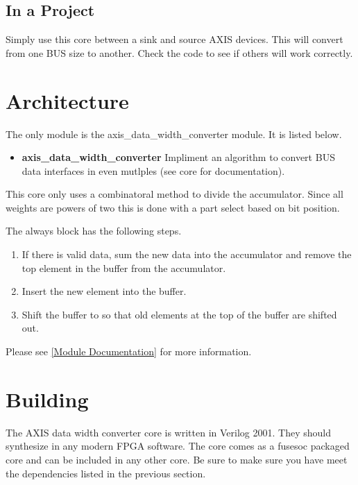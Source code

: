 

\subsection{In a Project}
\par
Simply use this core between a sink and source AXIS devices. This will convert from one BUS size to another. Check the code to see if others will work correctly.

\section{Architecture}
\par
The only module is the axis\_data\_width\_converter module. It is listed below.

\begin{itemize}
  \item \textbf{axis\_data\_width\_converter } Impliment an algorithm to convert BUS data interfaces in even mutlples (see core for documentation).
\end{itemize}

\par
This core only uses a combinatoral method to divide the accumulator. Since all weights are powers of two this is done with a part select based on bit position.

\par
The always block has the following steps.
\begin{enumerate}
\item If there is valid data, sum the new data into the accumulator and remove the top element in the buffer from the accumulator.
\item Insert the new element into the buffer.
\item Shift the buffer to so that old elements at the top of the buffer are shifted out.
\end{enumerate}

Please see \ref{Module Documentation} for more information.

\section{Building}

\par
The AXIS data width converter core is written in Verilog 2001. They should synthesize in any modern FPGA software. The core comes as a fusesoc packaged core and can be
included in any other core. Be sure to make sure you have meet the dependencies listed in the previous section.


